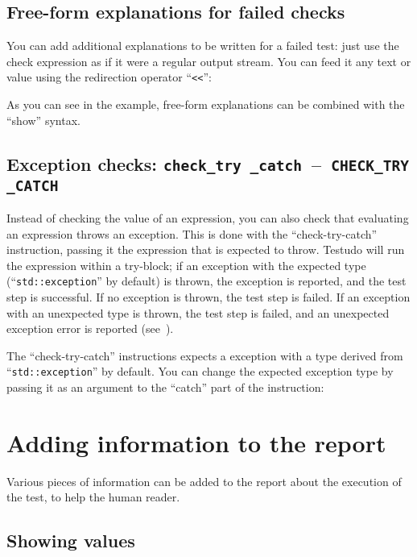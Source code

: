 \documentclass[twoside, a4paper, article]{memoir}
\newcommand*\testudocolor{\color{red!80!blue}}
\newcommand*\testudo[1]{\texttt{\testudocolor{}#1}}
\newcommand*\testudopair[2]{\testudo{#1}~--~\testudo{#2}}
\newcommand\subsectiontestudopair[3]{%
  \subsection[#1]{#1: \testudopair{#2}{#3}}}
\newcommand\typesetexampleandreport[1]{%
  \typesetexamplesource{#1}
  \typesetexamplereport{#1}
}
\providecommand\typesetexamplereport[1]{%
}
\providecommand\typesetexamplesource[1]{%
}
\begin{document}
\subsection{Free-form explanations for failed checks}
\label{sec:check-free-form-explanations}

You can add additional explanations to be written for a failed test: just use
the check expression as if it were a regular output stream.  You can feed it
any text or value using the redirection operator ``\texttt{<{}<}'':

\typesetexampleandreport{check-explain}

As you can see in the example, free-form explanations can be combined with the
``show'' syntax.

\subsectiontestudopair{Exception checks}%
  {check\_try \_catch}{CHECK\_TRY \_CATCH}
\label{sec:exception-checks}

Instead of checking the value of an expression, you can also check that
evaluating an expression throws an exception.  This is done with the
``check-try-catch'' instruction, passing it the expression that is expected to
throw.  Testudo will run the expression within a try-block; if an exception
with the expected type (``\texttt{std::exception}'' by default) is thrown, the
exception is reported, and the test step is successful.  If no exception is
thrown, the test step is failed. If an exception with an unexpected type is
thrown, the test step is failed, and an unexpected exception error is reported
(see~).

\typesetexampleandreport{check-try-catch}

The ``check-try-catch'' instructions expects a exception with a type derived
from ``\texttt{std::exception}'' by default.  You can change the expected
exception type by passing it as an argument to the ``catch'' part of the
instruction:

\typesetexampleandreport{check-try-catch-exception}


\section{Adding information to the report}
\label{sec:adding-information-report}

Various pieces of information can be added to the report about the execution of
the test, to help the human reader.

\subsection{Showing values}
\label{sec:showing-values}
\end{document}

